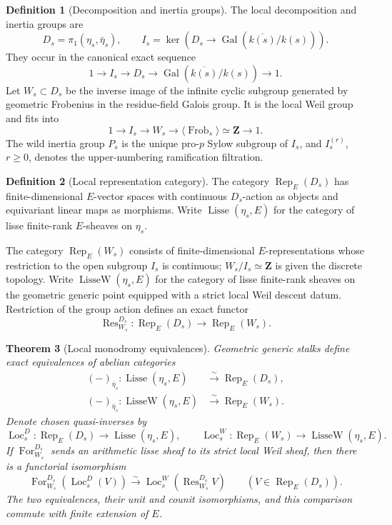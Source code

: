\documentclass[10pt]{article}
\newtheorem{theorem}{Theorem}[section]
\theoremstyle{definition}
\newtheorem{definition}[theorem]{Definition}
\newcommand{\Rep}{\operatorname{Rep}}
\newcommand{\Frob}{\operatorname{Frob}}
\begin{document}
\begin{definition}[Decomposition and inertia groups]
The local decomposition and inertia groups are
\[
 D_s=\pi_1(\eta_s,\bar\eta_s),\qquad
 I_s=\ker\!\left(D_s\longrightarrow
          \operatorname{Gal}(\overline{k(s)}/k(s))\right).
\]
They occur in the canonical exact sequence
\[
 1\longrightarrow I_s\longrightarrow D_s\longrightarrow
 \operatorname{Gal}(\overline{k(s)}/k(s))\longrightarrow1.
\]
Let \(W_s\subset D_s\) be the inverse image of the infinite cyclic subgroup
generated by geometric Frobenius in the residue-field Galois group.  It is
the local Weil group and fits into
\[
 1\longrightarrow I_s\longrightarrow W_s\longrightarrow
 \langle\Frob_s\rangle\simeq\mathbf Z\longrightarrow1.
\]
The wild inertia group \(P_s\) is the unique pro-\(p\) Sylow subgroup of
\(I_s\), and \(I_s^{(r)}\), \(r\ge0\), denotes the upper-numbering
ramification filtration.
\end{definition}

\begin{definition}[Local representation category]
The category \(\Rep_E(D_s)\) has finite-dimensional \(E\)-vector spaces with
continuous \(D_s\)-action as objects and equivariant linear maps as
morphisms.  Write \(\operatorname{Lisse}(\eta_s,E)\) for the category of
lisse finite-rank \(E\)-sheaves on \(\eta_s\).

The category \(\Rep_E(W_s)\) consists of finite-dimensional
\(E\)-representations whose restriction to the open subgroup \(I_s\) is
continuous; \(W_s/I_s\simeq\mathbf Z\) is given the discrete topology.
Write \(\operatorname{LisseW}(\eta_s,E)\) for the category of lisse
finite-rank sheaves on the geometric generic point equipped with a strict
local Weil descent datum.  Restriction of the group action defines an exact
functor
\[
 \operatorname{Res}^{D_s}_{W_s}:\Rep_E(D_s)
                  \longrightarrow\Rep_E(W_s).
\]
\end{definition}

\begin{theorem}[Local monodromy equivalences]
Geometric generic stalks define exact equivalences of abelian categories
\[
 \begin{aligned}
 (-)_{\bar\eta_s}:\operatorname{Lisse}(\eta_s,E)
     &\xrightarrow{\sim}\Rep_E(D_s),\\
 (-)_{\bar\eta_s}:\operatorname{LisseW}(\eta_s,E)
     &\xrightarrow{\sim}\Rep_E(W_s).
 \end{aligned}
\]
Denote chosen quasi-inverses by
\[
 \operatorname{Loc}_s^D:\Rep_E(D_s)\longrightarrow
      \operatorname{Lisse}(\eta_s,E),\qquad
 \operatorname{Loc}_s^W:\Rep_E(W_s)\longrightarrow
      \operatorname{LisseW}(\eta_s,E).
\]
If \(\operatorname{For}^{D_s}_{W_s}\) sends an arithmetic lisse sheaf to
its strict local Weil sheaf, then there is a functorial isomorphism
\[
 \operatorname{For}^{D_s}_{W_s}\!\left(
       \operatorname{Loc}_s^D(V)\right)
 \xrightarrow{\sim}
 \operatorname{Loc}_s^W\!\left(
       \operatorname{Res}^{D_s}_{W_s}V\right)
 \qquad(V\in\Rep_E(D_s)).
\]
The two equivalences, their unit and counit isomorphisms, and this
comparison commute with finite extension of \(E\).
\end{theorem}
\end{document}
